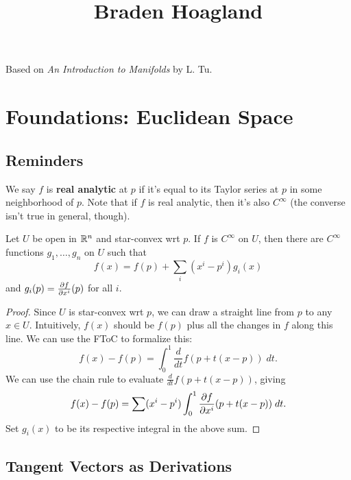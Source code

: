 \documentclass[twoside,10pt]{report}
\begin{document}
\title{Braden Hoagland}{Based on \textit{An Introduction to Manifolds} by L. Tu.}

\tableofcontents


\chapter{Foundations: Euclidean Space}

\section{Reminders}

We say $f$ is \textbf{real analytic} at $p$ if it's equal to its Taylor series at $p$ in some neighborhood of $p$. Note that if $f$ is real analytic, then it's also $C^{\infty}$ (the converse isn't true in general, though).

\begin{prop}
	Let $U$ be open in $\mathbb{R}^{n}$ and star-convex wrt $p$. If $f$ is $C^{\infty}$ on $U$, then there are $C^{\infty}$ functions $g_1, \dots, g_{n}$ on $U$ such that
	\[
		f(x) = f(p) + \sum_{i}(x^{i}-p^{i}) g_{i}(x)
	\] and $g_{i}(p) = \frac{\partial f}{\partial x^{i}} (p)$ for all $i$.
\end{prop}
\begin{proof}
	Since $U$ is star-convex wrt $p$, we can draw a straight line from $p$ to any $x \in U$. Intuitively, $f(x)$ should be $f(p)$ plus all the changes in $f$ along this line. We can use the FToC to formalize this:
	\[
		f(x) - f(p) = \int_{0}^{1} \frac{d}{dt} f(p+t(x-p))\;dt.
	\]
	We can use the chain rule to evaluate $\frac{d}{dt} f(p+t(x-p))$, giving
	\[
		f(x) - f(p) = \sum (x^{i} - p^{i}) \int_{0}^{1} \frac{\partial f}{\partial x^{i}} (p+t(x-p)) \;dt.
	\] 
	Set $g_{i}(x)$ to be its respective integral in the above sum.
\end{proof}

\section{Tangent Vectors as Derivations}
\end{document}
